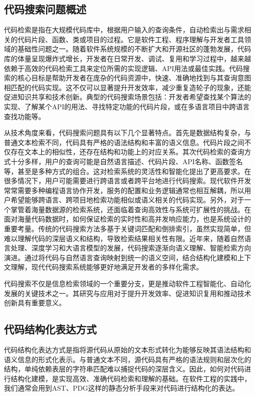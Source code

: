 \documentclass[UTF8,a4paper,12pt]{ctexart}
\numberwithin{equation}{section}
\begin{document}
\subsection{代码搜索问题概述}
代码检索是指在大规模代码库中，根据用户输入的查询条件，自动检索出与需求相关的代码片段、函数、类或项目的过程。它是软件工程、程序理解与开发者工具领域的基础性问题之一。随着软件系统规模的不断扩大和开源社区的蓬勃发展，代码库的体量呈现爆炸式增长，开发者在日常开发、调试、复用和学习过程中，越来越依赖于高效的代码检索工具来定位所需的实现逻辑、API用法或最佳实践。代码搜索的核心目标是帮助开发者在庞杂的代码资源中，快速、准确地找到与其查询意图相匹配的代码实现。这不仅可以显著提升开发效率，减少重复造轮子的现象，还能促进知识共享和技术创新。典型的代码搜索场景包括：开发者希望查找某个算法的实现、了解某个API的用法、寻找特定功能的代码片段，或在多语言项目中跨语言查找功能等。\par 
从技术角度来看，代码搜索问题具有以下几个显著特点。首先是数据结构复杂，与普通文本检索不同，代码具有严格的语法结构和丰富的语义信息。代码片段之间不仅存在文本上的相似性，还存在结构和功能上的对应关系。其次代码检索的查询方式十分多样，用户的查询可能是自然语言描述、代码片段、API名称、函数签名等，甚至是多种方式的组合。这对检索系统的灵活性和智能化提出了更高要求。在很多情况下，用户可能需要进行跨语言或者跨平台地进行代码搜索。现代软件开发常常需要多种编程语言协作开发，服务的配置和业务逻辑通常也相互解耦，所以用户希望能够跨语言、跨项目地检索功能相似或语义相关的代码实现。另外，对于一个掌管着海量数据源的检索系统，还面临着查询高效性与系统可扩展性的挑战。在面对海量代码数据时，如何保证检索的实时性和高并发响应能力，也是系统设计的重要考量。传统的代码搜索方法多基于关键词匹配和倒排索引，虽然实现简单，但难以理解代码的深层语义和结构，导致检索结果相关性有限。近年来，随着自然语言处理、深度学习和大语言模型的发展，代码搜索逐渐向语义理解、智能检索方向演进。通过将代码与自然语言查询映射到统一的语义空间，结合结构化建模和上下文理解，现代代码搜索系统能够更好地满足开发者的多样化需求。\par
代码搜索不仅是信息检索领域的一个重要分支，更是推动软件工程智能化、自动化发展的关键技术之一。其研究与应用对于提升开发效率、促进知识复用和推动技术创新具有重要意义。
\subsection{代码结构化表达方式}
代码结构化表达方式是指将源代码从原始的文本形式转化为能够反映其语法结构和语义信息的形式化表示。与普通文本不同，源代码具有严格的语法规则和层次化的结构，单纯依赖表层的字符串匹配难以捕捉代码的深层含义。因此，如何对代码进行结构化建模，是实现高效、准确代码检索和理解的基础。在软件工程的实践中，我们通常会用到AST、PDG这样的静态分析手段来对代码进行结构化的表达。
\end{document}
